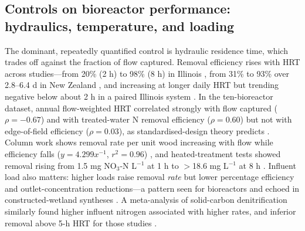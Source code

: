 \subsection{Controls on bioreactor performance: hydraulics, temperature, and loading}

The dominant, repeatedly quantified control is hydraulic residence time, which trades off against the fraction of flow captured. Removal efficiency rises with HRT across studies---from 20\% (2 h) to 98\% (8 h) in Illinois \parencite{Bell2015}, from 31\% to 93\% over 2.8--6.4 d in New Zealand \parencite{Rivas2020}, and increasing at longer daily HRT but trending negative below about 2 h in a paired Illinois system \parencite{Maxwell2022}. In the ten-bioreactor dataset, annual flow-weighted HRT correlated strongly with flow captured ($\rho=-0.67$) and with treated-water N removal efficiency ($\rho=0.60$) but not with edge-of-field efficiency ($\rho=0.03$), as standardised-design theory predicts \parencite{Christianson2026}. Column work shows removal rate per unit wood increasing with flow while efficiency falls ($y=4.299x^{-1}$, $r^2=0.96$) \parencite{Greenan2009}, and heated-treatment tests showed removal rising from 1.5 mg NO$_3$-N L$^{-1}$ at 1 h to $>$18.6 mg L$^{-1}$ at 8 h \parencite{Ma2021}. Influent load also matters: higher loads raise removal \emph{rate} but lower percentage efficiency and outlet-concentration reductions---a pattern seen for bioreactors \parencite{Rivas2020,Christianson2026} and echoed in constructed-wetland syntheses \parencite{Mendes2021}. A meta-analysis of solid-carbon denitrification similarly found higher influent nitrogen associated with higher rates, and inferior removal above 5-h HRT for those studies \parencite{Zhang2021b}.

